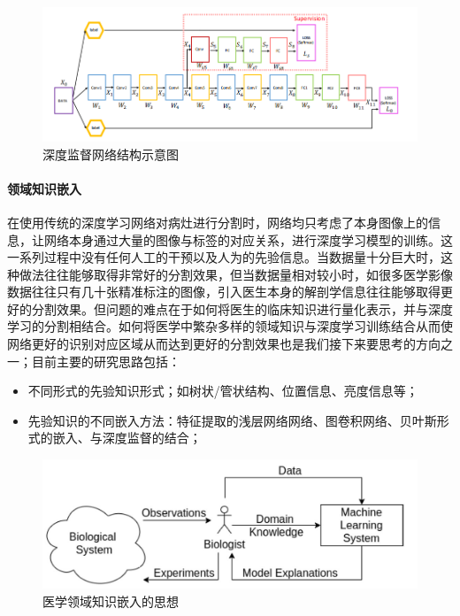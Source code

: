 \documentclass[lang=cn,11pt,a4paper,cite=numbers]{elegantpaper}
\begin{document}
\begin{figure}[H]
    \centering
    \includegraphics[scale=0.8]{./image/后期展望/8-layer.png}
    \caption{深度监督网络结构示意图\cite{24}}
    \label{fig:DeepSupervision}
\end{figure}

\paragraph{领域知识嵌入}
在使用传统的深度学习网络对病灶进行分割时，网络均只考虑了本身图像上的信息，让网络本身通过大量的图像与标签的对应关系，进行深度学习模型的训练。这一系列过程中没有任何人工的干预以及人为的先验信息。当数据量十分巨大时，这种做法往往能够取得非常好的分割效果，但当数据量相对较小时，如很多医学影像数据往往只有几十张精准标注的图像，引入医生本身的解剖学信息往往能够取得更好的分割效果。但问题的难点在于如何将医生的临床知识进行量化表示，并与深度学习的分割相结合。如何将医学中繁杂多样的领域知识与深度学习训练结合从而使网络更好的识别对应区域从而达到更好的分割效果也是我们接下来要思考的方向之一；目前主要的研究思路包括：

\begin{itemize}
    \item 不同形式的先验知识形式；如树状/管状结构、位置信息、亮度信息等；
    \item 先验知识的不同嵌入方法：特征提取的浅层网络网络、图卷积网络、贝叶斯形式的嵌入、与深度监督的结合；
\end{itemize}

\begin{figure}[H]
    \centering
    \includegraphics[scale=0.6]{./image/后期展望/DomainKnowledge.jpg}
    \caption{医学领域知识嵌入的思想\cite{25}}
    \label{fig:DomainKnowledge}
\end{figure}
\end{document}
